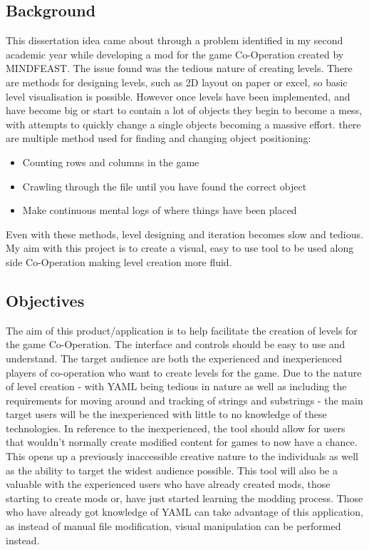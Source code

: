 \subsection{Background}
This dissertation idea came about through a problem identified in my second academic year while developing a mod for the game Co-Operation created by MINDFEAST. The issue found was the tedious nature of creating levels. There are methods for designing levels, such as 2D layout on paper or excel, so basic level visualisation is possible. However once levels have been implemented, and have become big or start to contain a lot of objects they begin to become a mess, with attempts to quickly change a single objects becoming a massive effort. there are multiple method used for finding and changing object positioning:
\begin{itemize}
    \item Counting rows and columns in the game 
    \item Crawling through the file until you have found the correct object
    \item Make continuous mental logs of where things have been placed 
\end{itemize}
Even with these methods, level designing and iteration becomes slow and tedious. My aim with this project is to create a visual, easy to use tool to be used along side Co-Operation making level creation more fluid. 
\subsection{Objectives}
The aim of this product/application is to  help facilitate the creation of levels for the game Co-Operation. The interface and controls should be easy to use and understand. The target audience are both the experienced and inexperienced players of co-operation who want to create levels for the game. Due to the nature of level creation - with YAML being tedious in nature as well as including the requirements for moving around and tracking of strings and substrings - the main target users will be the inexperienced with little to no knowledge of these technologies. 
In reference to the inexperienced, the tool should allow for users that wouldn't normally create modified content for games to now have a chance. This opens up a previously inaccessible creative nature to the individuals as well as the ability to target the widest audience possible.
This tool will also be a valuable with the experienced users who have already created mods, those starting to create mods or, have just started learning the modding process. Those who have already got knowledge of YAML can take advantage of this application, as instead of manual file modification, visual manipulation can be performed instead.

